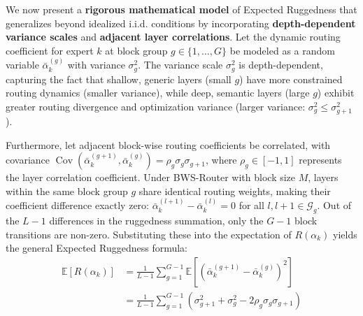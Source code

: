 We now present a \textbf{rigorous mathematical model} of Expected Ruggedness that generalizes beyond idealized i.i.d. conditions by incorporating \textbf{depth-dependent variance scales} and \textbf{adjacent layer correlations}. Let the dynamic routing coefficient for expert $k$ at block group $g \in \{1, \dots, G\}$ be modeled as a random variable $\bar{\alpha}_k^{(g)}$ with variance $\sigma_g^2$. The variance scale $\sigma_g^2$ is depth-dependent, capturing the fact that shallow, generic layers (small $g$) have more constrained routing dynamics (smaller variance), while deep, semantic layers (large $g$) exhibit greater routing divergence and optimization variance (larger variance: $\sigma_g^2 \le \sigma_{g+1}^2$).

Furthermore, let adjacent block-wise routing coefficients be correlated, with covariance $\operatorname{Cov}\left(\bar{\alpha}_k^{(g+1)}, \bar{\alpha}_k^{(g)}\right) = \rho_g \sigma_g \sigma_{g+1}$, where $\rho_g \in [-1, 1]$ represents the layer correlation coefficient. Under BWS-Router with block size $M$, layers within the same block group $g$ share identical routing weights, making their coefficient difference exactly zero: $\bar{\alpha}_k^{(l+1)} - \bar{\alpha}_k^{(l)} = 0$ for all $l, l+1 \in \mathcal{G}_g$. Out of the $L-1$ differences in the ruggedness summation, only the $G-1$ block transitions are non-zero. Substituting these into the expectation of $R(\alpha_k)$ yields the general Expected Ruggedness formula:
\begin{align}
    \mathbb{E}[R(\alpha_k)] &= \frac{1}{L-1} \sum_{g=1}^{G-1} \mathbb{E}\left[ \left( \bar{\alpha}_k^{(g+1)} - \bar{\alpha}_k^{(g)} \right)^2 \right] \\
    &= \frac{1}{L-1} \sum_{g=1}^{G-1} \left( \sigma_{g+1}^2 + \sigma_g^2 - 2 \rho_g \sigma_g \sigma_{g+1} \right)
\end{align}

